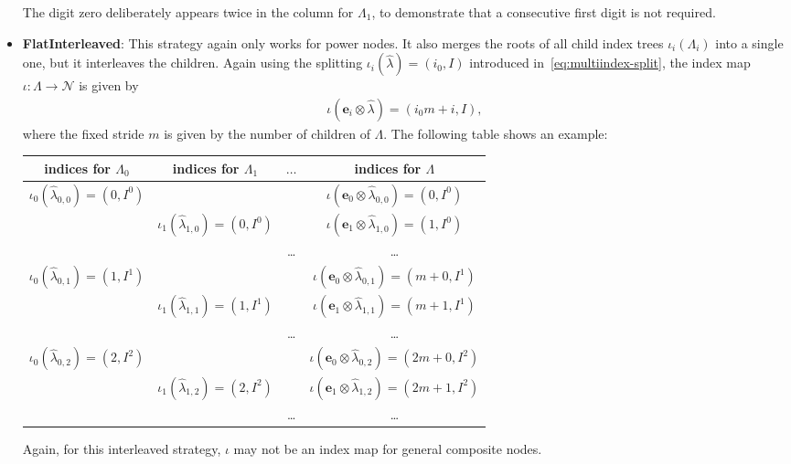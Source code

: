 \documentclass[a4paper,10pt,headings=normal,bibliography=totoc]{scrartcl}
\begin{document}
\begin{itemize}
    The digit zero deliberately appears twice in the column for $\Lambda_1$, to demonstrate
    that a consecutive first digit is not required.

  \item \textbf{FlatInterleaved}: This strategy again only works for power nodes.
    It also merges
    the roots of all child index trees $\iota_i(\Lambda_i)$
    into a single one, but it interleaves the children.
    Again using the splitting
    $\iota_i(\hat{\lambda}) = (i_0,I)$ introduced in~\eqref{eq:multiindex-split},
    the index map $\iota:\Lambda \to \mathcal{N}$ is given by
    \begin{align*}
      \iota(\mathbf{e}_i \otimes\hat{\lambda}) = (i_0 m + i, I),
    \end{align*}
    where the fixed stride $m$ is given by the number of children of $\Lambda$.
    The following table shows an example:

    \begin{center}
    \begin{tabular}{c|c|c|c}
      indices for $\Lambda_0$ &
      indices for $\Lambda_1$ &
      \hspace{1em}$\dots$\hspace{1em} &
      indices for $\Lambda$ \\
      \hline
      $\iota_0(\hat{\lambda}_{0,0}) = (0,I^0)$ & & &
        $\iota(\mathbf{e}_0 \otimes \hat{\lambda}_{0,0}) = (0,I^0)$ \\
      & $\iota_1(\hat{\lambda}_{1,0}) = (0,I^0)$ & &
        $\iota(\mathbf{e}_1 \otimes \hat{\lambda}_{1,0}) = (1,I^0)$ \\
      & & \dots &
        \dots \\
      $\iota_0(\hat{\lambda}_{0,1}) = (1,I^1)$ & & &
        $\iota(\mathbf{e}_0 \otimes \hat{\lambda}_{0,1}) = (m+0,I^1)$ \\
      & $\iota_1(\hat{\lambda}_{1,1}) = (1,I^1)$ & &
        $\iota(\mathbf{e}_1 \otimes \hat{\lambda}_{1,1}) = (m+1,I^1)$ \\
      & & \dots &
        \dots \\
      $\iota_0(\hat{\lambda}_{0,2}) = (2,I^2)$ & & &
        $\iota(\mathbf{e}_0 \otimes \hat{\lambda}_{0,2}) = (2m+0,I^2)$ \\
      & $\iota_1(\hat{\lambda}_{1,2}) = (2,I^2)$ & &
        $\iota(\mathbf{e}_1 \otimes \hat{\lambda}_{1,2}) = (2m+1,I^2)$ \\
      & & \dots &
        \dots \\
    \end{tabular}
    \end{center}

    Again, for this interleaved strategy, $\iota$ may not be an
    index map for general composite nodes.
\end{itemize}
\end{document}
